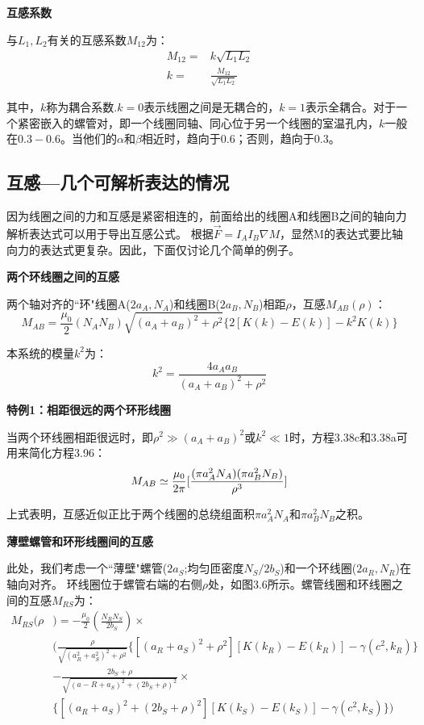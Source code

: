 \textbf{互感系数} 

  与$L_1,L_2$有关的互感系数$M_{12}$为：
\begin{subequations}
	\begin{align}
M_{12}=&k\sqrt{L_1L_2}\\%
k=&\frac{M_{12}}{\sqrt{L_1L_2}}%
	\end{align}
\end{subequations}

其中，$k$称为耦合系数.$k=0$表示线圈之间是无耦合的，$k=1$表示全耦合。对于一个紧密嵌入的螺管对，即一个线圈同轴、同心位于另一个线圈的室温孔内，$k$一般在$0.3-0.6$。当他们的$\alpha$和$\beta$相近时，趋向于0.6；否则，趋向于0.3。


\subsection{互感---几个可解析表达的情况}
因为线圈之间的力和互感是紧密相连的，前面给出的线圈A和线圈B之间的轴向力解析表达式可以用于导出互感公式。
根据$\vec{F}=I_A I_B \nabla M$，显然M的表达式要比轴向力的表达式更复杂。因此，下面仅讨论几个简单的例子。

\textbf{两个环线圈之间的互感} 

两个轴对齐的``环"线圈A($2a_A,N_A$)和线圈B($2a_B,N_B$)相距$\rho$，互感$M_{AB}(\rho)$：
  \begin{equation}
M_{AB}=\frac{\mu_0}{2}(N_AN_B)\sqrt{(a_A+a_B)^2+\rho^2}\{2[K(k)-E(k)]-k^2K(k)\}%
\end{equation}

本系统的模量$k^2$为：
\begin{equation*}
k^2=\frac{4a_Aa_B}{(a_A+a_B)^2+\rho^2}%
\end{equation*}

\textbf{特例1：相距很远的两个环形线圈} 

  当两个环线圈相距很远时，即$\rho^2\gg(a_A+a_B)^2$或$k^2\ll 1$时，方程3.38c和3.38a可用来简化方程3.96：
\begin{equation}
M_{AB}\simeq\frac{\mu_0}{2\pi}[\frac{(\pi a_A^2N_A)(\pi a_B^2N_B)}{\rho^3}]\\%
\end{equation}

上式表明，互感近似正比于两个线圈的总绕组面积$\pi a_A^2 N_A$和$\pi a_B^2 N_B$之积。

\textbf{薄壁螺管和环形线圈间的互感} 

  此处，我们考虑一个``薄壁"螺管($2a_S$;均匀匝密度$N_S/2b_S$)和一个环线圈($2a_R,N_R$)在轴向对齐。
  环线圈位于螺管右端的右侧$\rho$处，如图3.6所示。螺管线圈和环线圈之间的互感$M_{RS}$为：
  \begin{equation}
  \begin{split}
M_{RS}(\rho&)=-\frac{\mu_0}{2}(\frac{N_RN_S}{2b_S})\times\\
&(\frac{\rho}{\sqrt{(a_R^2+a_S^2)^2+\rho^2}}\{[(a_R+a_S)^2+\rho^2][K(k_R)-E(k_R)]-\gamma(c^2,k_R)\}\\
&-\frac{2b_S+\rho}{\sqrt{(a-R+a_S)^2+(2b_S+\rho)^2}}\times\\
&\{[(a_R+a_S)^2+(2b_S+\rho)^2][K(k_S)-E(k_S)]-\gamma(c^2,k_S)\})%
  \end{split}
\end{equation}

